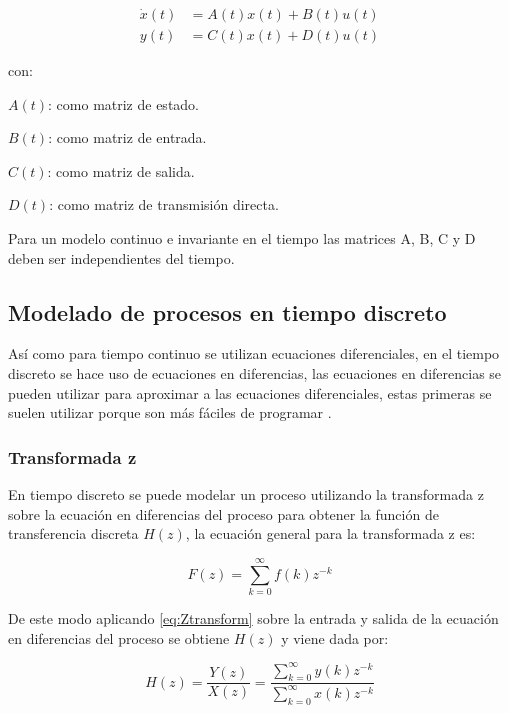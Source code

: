 			\begin{align}\label{eq:SSrepresentation}
				\dot{x}(t) &= A(t)x(t) + B(t)u(t) \\
				y(t) &= C(t)x(t) + D(t)u(t)
			\end{align}
			
			\begin{spacing}{1.5}
				con: 
				
				$A(t)$: como matriz de estado.
				
				$B(t)$: como matriz de entrada.
				
				$C(t)$: como matriz de salida.
				
				$D(t)$: como matriz de transmisión directa.
				
			\end{spacing}
			
			Para un modelo continuo e invariante en el tiempo las matrices A, B, C y D deben ser independientes del tiempo.
			
	\subsection{Modelado de procesos en tiempo discreto}
	
		Así como para tiempo continuo se utilizan ecuaciones diferenciales, en el tiempo discreto se hace uso de ecuaciones en diferencias, las ecuaciones en diferencias se pueden utilizar para aproximar a las ecuaciones diferenciales, estas primeras se suelen utilizar porque son más fáciles de programar \Parencite{kuo1996sistemas}.
	
		\subsubsection{Transformada z}
		
			En tiempo discreto se puede modelar un proceso utilizando la transformada z sobre la ecuación en diferencias del proceso para obtener la función de transferencia discreta $H(z)$, la ecuación general para la transformada z es:
			
			\begin{equation}\label{eq:Ztransform}
				F(z)= \sum\limits_{k=0}^{\infty}f(k)z^{-k}
			\end{equation}
			
			De este modo aplicando \cref{eq:Ztransform} sobre la entrada y salida de la ecuación en diferencias del proceso se obtiene $H(z)$ y viene dada por:
			
			\begin{equation}\label{eq:ZTransfer}
				H(z) =	\frac{Y(z)}{X(z)} = \frac{\displaystyle\sum\limits_{k=0}^{\infty}y(k)z^{-k}}{\displaystyle\sum\limits_{k=0}^{\infty}x(k)z^{-k}}
			\end{equation}
		
